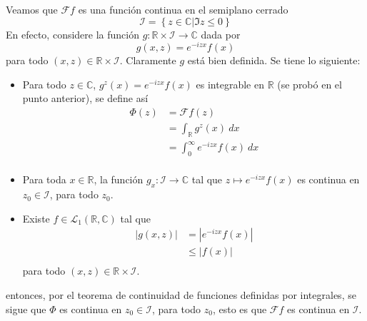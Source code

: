 \documentclass[12pt]{report}
\newcounter{it}
\theoremstyle{largebreak}
\renewcommand{\leq}{\ensuremath{\leqslant}}
\newcommand\abs[1]{\ensuremath{\left|#1\right|}}
\newcommand\cf[3]{\ensuremath{#1:#2\rightarrow#3}}
\newcommand{\fou}[1]{\ensuremath{\mathcal{F}#1}}
\begin{document}
\begin{sol}
        Veamos que $\fou{f}$ es una función continua en el semiplano cerrado
        \begin{equation*}
            \mathcal{I}=\left\{z\in\mathbb{C}\Big|\Im z\leq0 \right\}
        \end{equation*}
        En efecto, considere la función $\cf{g}{\mathbb{R}\times\mathcal{I}}{\mathbb{C}}$ dada por
        \begin{equation*}
            g(x,z)=e^{ -izx}f(x)
        \end{equation*}
        para todo $(x,z)\in\mathbb{R}\times\mathcal{I}$. Claramente $g$ está bien definida. Se tiene lo siguiente:
        \begin{itemize}
            \item Para todo $z\in\mathbb{C}$, $g^z(x)=e^{ -izx}f(x)$ es integrable en $\mathbb{R}$ (se probó en el punto anterior), se define así
            \begin{equation*}
                \begin{split}
                    \Phi(z)&=\fou{f}(z)\\
                    &=\int_{\mathbb{R}}g^z(x)\:dx\\
                    &=\int_0^{\infty}e^{-izx}f(x)\:dx\\
                \end{split}
            \end{equation*}
            \item Para toda $x\in\mathbb{R}$, la función $\cf{g_x}{\mathcal{I}}{\mathbb{C}}$ tal que $z\mapsto e^{ -izx}f(x)$ es continua en $z_0\in\mathcal{I}$, para todo $z_0$.
            \item Existe $f\in\mathcal{L}_1(\mathbb{R},\mathbb{C})$ tal que
            \begin{equation*}
                \begin{split}
                    \abs{g(x,z)}&=\abs{e^{ -izx}f(x)}\\
                    &\leq\abs{f(x)}\\
                \end{split}
            \end{equation*}
            para todo $(x,z)\in\mathbb{R}\times\mathcal{I}$.
        \end{itemize}
        entonces, por el teorema de continuidad de funciones definidas por integrales, se sigue que $\Phi$ es continua en $z_0\in\mathcal{I}$, para todo $z_0$, esto es que $\fou{f}$ es continua en $\mathcal{I}$.


\end{sol}
\end{document}

